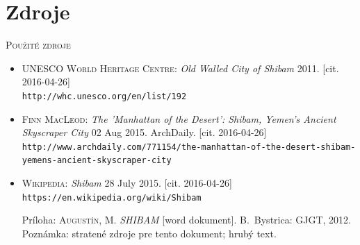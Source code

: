 \documentclass[xcolor=dvipsnames]{beamer}
\begin{document}
\section{Zdroje}
\begin{frame}{\textsc{Použité zdroje}}
\transdissolve
	\footnotesize
	\begin{itemize}
	\item {{\textsc{UNESCO World Heritage Centre}}}: \emph{Old Walled City of Shibam} 2011. {\scriptsize[cit. 2016-04-26]}\\
		\texttt{http://whc.unesco.org/en/list/192}
	\item {{\textsc{Finn MacLeod}}}: \emph{The 'Manhattan of the Desert': Shibam, Yemen's Ancient Skyscraper City}  02 Aug 2015. ArchDaily. {\scriptsize[cit. 2016-04-26]}\\
		\texttt{http://www.archdaily.com/771154/the-manhattan-of-the-desert-shibam-yemens-ancient-skyscraper-city}
	\item {{\textsc{Wikipedia}}}: \emph{Shibam} 28 July 2015. {\scriptsize[cit. 2016-04-26]}\\
		\texttt{https://en.wikipedia.org/wiki/Shibam}
	\item[Príloha:] {{\textsc{Augustín, M}}}. \emph{SHIBAM} {\scriptsize[word dokument]}. B.~Bystrica: GJGT, 2012.\\
		{\scriptsize Poznámka: stratené zdroje pre tento dokument; hrubý text.}
	\end{itemize}
\end{frame}
\end{document}
